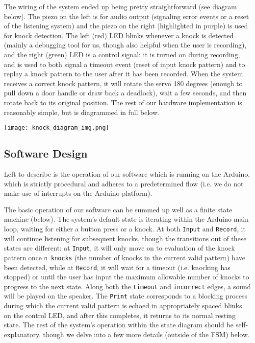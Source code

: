 \documentclass[11pt]{article}			%
\begin{document}
The wiring of the system ended up being pretty straightforward (see diagram below). The piezo on the left is for audio output (signaling error events or a reset of the listening system) and the piezo on the right (highlighted in purple) is used for knock detection. The left (red) LED blinks whenever a knock is detected (mainly a debugging tool for us, though also helpful when the user is recording), and the right (green) LED is a control signal: it is turned on during recording, and is used to both signal a timeout event (reset of input knock pattern) and to replay a knock pattern to the user after it has been recorded. When the system receives a correct knock pattern, it will rotate the servo 180 degrees (enough to pull down a door handle or draw back a deadlock), wait a few seconds, and then rotate back to its original position. The rest of our hardware implementation is reasonably simple, but is diagrammed in full below.

\begin{center}
\texttt{[image: knock\_diagram\_img.png]}
\end{center}

\subsection{Software Design}

Left to describe is the operation of our software which is running on the Arduino, which is strictly procedural and adheres to a predetermined flow (i.e. we do not make use of interrupts on the Arduino platform).

The basic operation of our software can be summed up well as a finite state machine (below). The system's default state is iterating within the Arduino main loop, waiting for either a button press or a knock. At both \verb|Input| and \verb|Record|, it will continue listening for subsequent knocks, though the transitions out of these states are different: at \verb|Input|, it will only move on to evaluation of the knock pattern once \verb|n knocks| (the number of knocks in the current valid pattern) have been detected, while at \verb|Record|, it will wait for a timeout (i.e. knocking has stopped) or until the user has input the maximum allowable number of knocks to progress to the next state. Along both the \verb|timeout| and \verb|incorrect| edges, a sound will be played on the speaker. The \verb|Print| state corresponds to a blocking process during which the current valid pattern is echoed in appropriately spaced blinks on the control LED, and after this completes, it returns to its normal resting state. The rest of the system's operation within the state diagram should be self-explanatory, though we delve into a few more details (outside of the FSM) below.
\end{document}
